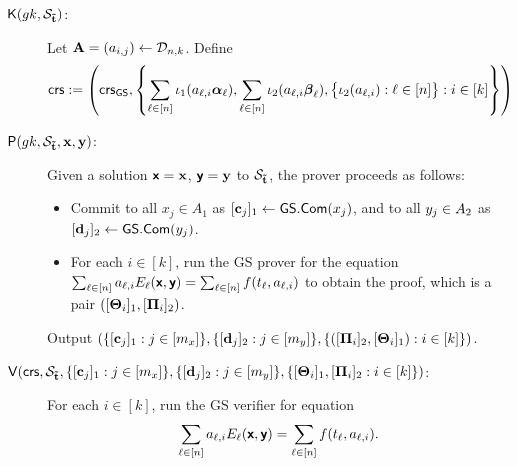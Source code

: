 \begin{description}


\item[$\mathsf{K}({gk}, \mathcal{S}_{\mathbf{\tilde{t}}})$:]
Let $\mathbf{{A}}=(a_{i,j}) \gets \mathcal{D}_{n,k}$. Define 
$$\mathsf{crs}:=\left(\mathsf{crs}_{{\mathsf{GS}}}, \left\{\sum_{\ell\in[n]}\iota_1(a_{\ell,i} {\boldsymbol \alpha}_\ell), \sum_{\ell\in[n]} \iota_2(a_{\ell,i} {\boldsymbol \beta}_\ell), \big\{\iota_{2}(a_{\ell,i}): \ell \in [n]\big\}: i \in [k]\right\}\right)$$
\item[$\mathsf{P}({gk}, \mathcal{S}_{\mathbf{\tilde{t}}},\mathbf{x},\mathbf{y})$:] 
Given a solution $\textbf{\textsf{x}}=\mathbf{x}$,  $\textbf{\textsf{y}}=\mathbf{y}$ to $\mathcal{S}_{\mathbf{\tilde{t}}}$, the prover proceeds as follows:
\begin{itemize}
\item Commit to all $x_j \in A_1$ as $[\mathbf{c}_j]_1\gets\mathsf{GS.Com}(x_j)$, and to all 
$y_j\in A_2$ as $[\mathbf{d}_j]_2\gets\mathsf{GS.Com}(y_j)$.

\item For each $i \in [k]$, run the GS prover for the equation $\sum_{\ell\in[n]} a_{\ell,i} E_{\ell}(\textbf{\textsf{x}},\textbf{\textsf{y}})\allowbreak = \sum_{\ell \in [n]} f(t_{\ell}, a_{\ell,i})$ to obtain the proof, which is a pair  $([\mathbf{{\Theta}}_i]_1,[\mathbf{{\Pi}}_i]_2)$.
\end{itemize}
Output 
$(\{[\mathbf{c}_j]_1 : j \in [m_x]\}, \{[\mathbf{d}_j]_2: j \in [m_y]\}, \{([\mathbf{{\Pi}}_{i}]_2,[\mathbf{{\Theta}}_{i}]_1) : i \in [k]\})$.
\item[$\mathsf{V}(\mathsf{crs},\mathcal{S}_{\mathbf{\tilde{t}}},{\{[\mathbf{c}_j]_1 : j\in[m_x]\},\{[\mathbf{d}_j]_2:j\in[m_y]\}, \{[\mathbf{{\Theta}}_{i}]_1,[\mathbf{{\Pi}}_{i}]_2:i \in [k]\}})$:] For each $i \in [k]$, run the GS verifier for equation
$$\sum_{\ell\in[n]} a_{\ell,i} E_{\ell}(\textbf{\textsf{x}},\textbf{\textsf{y}})= \sum_{\ell \in [n]} f(t_{\ell}, a_{\ell,i}).$$
\end{description}  

